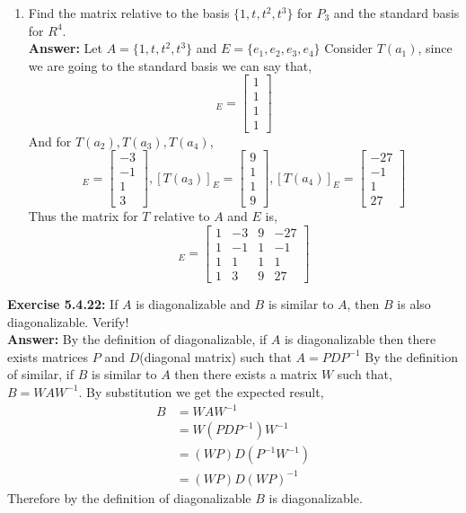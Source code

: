 \documentclass{amsart}
\begin{document}
\begin{enumerate}
\item Find the matrix relative to the basis $\{1,t,t^2,t^3\}$ for $P_3$ and the standard basis for $R^4$.\\
\noindent \textbf{Answer: } Let $A = \{1,t,t^2,t^3\}$ and $E = \{e_1,e_2,e_3,e_4\}$
Consider $T(a_1)$, since we are going to the standard basis  we can say that,
\begin{equation*}
[T(a_1)]_E = 
\begin{bmatrix}
1\\
1\\
1\\
1
\end{bmatrix}
\end{equation*}
And for $T(a_2),T(a_3), T(a_4)$,
\begin{equation*}
[T(a_2)]_E = 
\begin{bmatrix}
-3\\
-1\\
1\\
3
\end{bmatrix},
[T(a_3)]_E = 
\begin{bmatrix}
9\\
1\\
1\\
9
\end{bmatrix},
[T(a_4)]_E = 
\begin{bmatrix}
-27\\
-1\\
1\\
27
\end{bmatrix}
\end{equation*}
Thus the matrix for $T$ relative to $A$ and $E$ is,
\begin{equation*}
[T(A)]_E = 
\begin{bmatrix}
1& -3& 9& -27\\
1 &-1 &1 &-1\\
1 &1 & 1& 1\\
1 &3 &9 &27
\end{bmatrix}
\end{equation*}
\vspace{1in}
	
\end{enumerate}




\noindent\textbf{Exercise 5.4.22: } If $A$ is diagonalizable and $B$ is similar to $A$, then $B$ is also diagonalizable. Verify!\\
\noindent \textbf{Answer: } By the definition of diagonalizable, if $A$ is diagonalizable then there exists matrices $P$ and $D$(diagonal matrix) such that $A = PDP^{-1}$ By the definition of similar, if $B$ is similar to $A$ then there exists a matrix $W$ such that, $B = WAW^{-1}$. By substitution we get the expected result,
\begin{align*}
B &= WAW^{-1}\\
&= W(PDP^{-1})W^{-1}\\
&= (WP)D(P^{-1}W^{-1})\\
&= (WP)D(WP)^{-1}
\end{align*}
Therefore by the definition of diagonalizable $B$ is diagonalizable. 
\vspace{1in}
\end{document}
